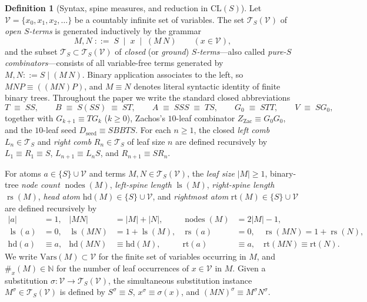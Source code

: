 \documentclass[11pt,reqno]{amsart}
\numberwithin{equation}{section}
\theoremstyle{plain}
\theoremstyle{definition}
\newtheorem{definition}[theorem]{Definition}
\theoremstyle{remark}
\DeclareMathOperator{\nodes}{nodes}
\DeclareMathOperator{\ls}{ls}
\DeclareMathOperator{\rs}{rs}
\newcommand{\CLS}{\mathrm{CL}(S)}
\newcommand{\TS}{\mathcal{T}_S}
\newcommand{\TSV}{\mathcal{T}_S(\mathcal{V})}
\begin{document}
\begin{definition}[Syntax, spine measures, and reduction in $\CLS$]\label{def:syntax}
Let $\mathcal{V} = \{x_0, x_1, x_2, \dots\}$ be a countably infinite set of variables. The set $\TSV$ of \emph{open $S$-terms} is generated inductively by the grammar
\[
  M, N \;::=\; S \;\mid\; x \;\mid\; (M\,N) \qquad (x \in \mathcal{V}),
\]
and the subset $\TS \subset \TSV$ of \emph{closed} (or \emph{ground}) \emph{$S$-terms}---also called \emph{pure-$S$ combinators}---consists of all variable-free terms generated by $M, N ::= S \mid (M\,N)$. Binary application associates to the left, so $M N P \equiv ((M N) P)$, and $M \equiv N$ denotes literal syntactic identity of finite binary trees. Throughout the paper we write the standard closed abbreviations
\[
  T \;\equiv\; S S, \qquad B \;\equiv\; S(S S) \;\equiv\; S T, \qquad A \;\equiv\; S S S \;\equiv\; T S, \qquad G_0 \;\equiv\; S T T, \qquad V \;\equiv\; S G_0,
\]
together with $G_{k+1} \equiv T G_k$ ($k \ge 0$), Zachos's $10$-leaf combinator $Z_{\mathrm{Zac}} \equiv G_0 G_0$, and the $10$-leaf seed $D_{\mathrm{seed}} \equiv S B B T S$. For each $n \ge 1$, the closed \emph{left comb} $L_n \in \TS$ and \emph{right comb} $R_n \in \TS$ of leaf size $n$ are defined recursively by $L_1 \equiv R_1 \equiv S$, $L_{n+1} \equiv L_n S$, and $R_{n+1} \equiv S R_n$.

For atoms $a \in \{S\} \cup \mathcal{V}$ and terms $M, N \in \TSV$, the \emph{leaf size} $|M| \ge 1$, binary-tree \emph{node count} $\nodes(M)$, \emph{left-spine length} $\ls(M)$, \emph{right-spine length} $\rs(M)$, \emph{head atom} $\mathrm{hd}(M) \in \{S\} \cup \mathcal{V}$, and \emph{rightmost atom} $\mathrm{rt}(M) \in \{S\} \cup \mathcal{V}$ are defined recursively by
\begin{align*}
  |a| &= 1, & |M N| &= |M| + |N|, & \nodes(M) &= 2|M| - 1, \\
  \ls(a) &= 0, & \ls(M N) &= 1 + \ls(M), & \rs(a) &= 0,\quad \rs(M N) = 1 + \rs(N), \\
  \mathrm{hd}(a) &\equiv a, & \mathrm{hd}(M N) &\equiv \mathrm{hd}(M), & \mathrm{rt}(a) &\equiv a,\quad \mathrm{rt}(M N) \equiv \mathrm{rt}(N).
\end{align*}
We write $\mathrm{Vars}(M) \subset \mathcal{V}$ for the finite set of variables occurring in $M$, and $\#_x(M) \in \mathbb{N}$ for the number of leaf occurrences of $x \in \mathcal{V}$ in $M$. Given a substitution $\sigma \colon \mathcal{V} \to \TSV$, the simultaneous substitution instance $M^\sigma \in \TSV$ is defined by $S^\sigma \equiv S$, $x^\sigma \equiv \sigma(x)$, and $(M N)^\sigma \equiv M^\sigma N^\sigma$.


\end{definition}
\end{document}
